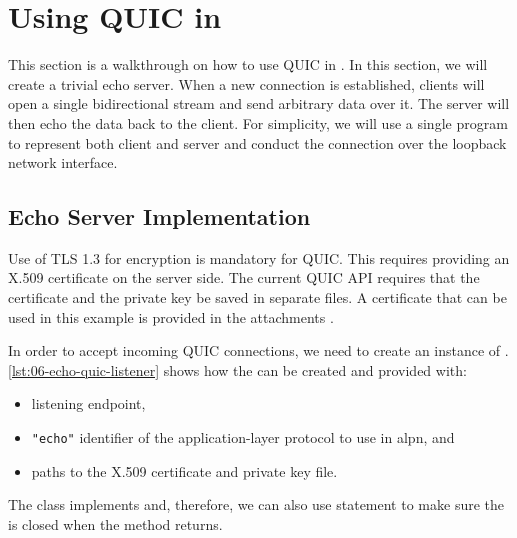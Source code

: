 \section{Using QUIC in \dotnet{}}

This section is a walkthrough on how to use QUIC in \dotnet{}. In this section, we will create a
trivial echo server. When a new connection is established, clients will open a single bidirectional
stream and send arbitrary data over it. The server will then echo the data back to the client. For
simplicity, we will use a single \dotnet{} program to represent both client and server and conduct
the connection over the loopback network interface.

\subsection{Echo Server Implementation}

Use of TLS 1.3 for encryption is mandatory for QUIC. This requires providing an X.509 certificate on
the server side. The current QUIC API requires that the certificate and the private key be saved in
separate files. A certificate that can be used in this example is provided in the attachments
. 


In order to accept incoming QUIC connections, we need to create an instance of \QuicListener{}.
\autoref{lst:06-echo-quic-listener} shows how the \QuicListener{} can be created and provided with:

\begin{itemize}

  \item listening endpoint,

  \item \texttt{"echo"} identifier of the application-layer protocol to use in \gls{alpn}, and

  \item paths to the X.509 certificate and private key file.

\end{itemize}

The \QuicListener{} class implements  and, therefore, we can also use
 statement to make sure the \QuicListener{} is closed when the method returns.

